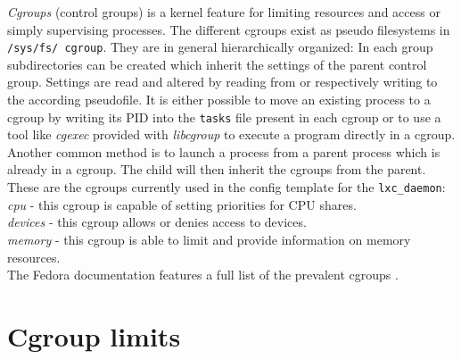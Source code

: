 \textit{Cgroups} (control groups) is a kernel feature for limiting resources and access or simply supervising processes. The different cgroups exist as
pseudo filesystems in \texttt{/sys/fs/ cgroup}. They are in general hierarchically organized: In each group subdirectories can be created
which inherit the settings of the parent control group. Settings are read and altered by reading from or respectively writing to the according
pseudofile. It is either possible to move an existing process to a cgroup by writing its PID into the \texttt{tasks} file present in each cgroup
or to use a tool like \textit{cgexec} provided with \textit{libcgroup}\cite{libcgroup} to execute a program directly in a cgroup.
Another common method is to launch a process from a parent process which is already in a cgroup. The child will then inherit the cgroups
from the parent.\\
These are the cgroups currently used in the config template for the \texttt{lxc\_daemon}:\\
\textit{cpu} - this cgroup is capable of setting priorities for CPU shares.\\
\textit{devices} - this cgroup allows or denies access to devices. \\
\textit{memory} - this cgroup is able to limit and provide information on memory resources.\\
The Fedora documentation features a full list of the prevalent cgroups \cite{cgroups}.

\section{Cgroup limits}

